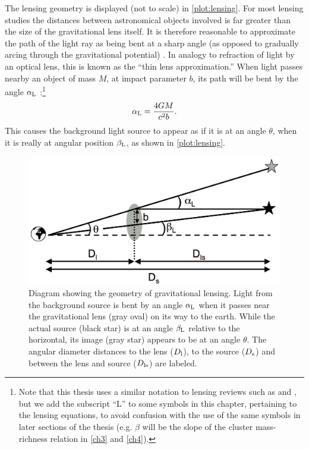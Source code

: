 The lensing geometry is displayed (not to scale) in \autoref{plot:lensing}. For most lensing studies the distances between astronomical objects involved is far greater than the size of the gravitational lens itself. It is therefore reasonable to approximate the path of the light ray as being bent at a sharp angle (as opposed to gradually arcing through the gravitational potential) \citep{BS01}. In analogy to refraction of light by an optical lens, this is known as the ``thin lens approximation.'' When light passes nearby an object of mass $M$, at impact parameter $b$, its path will be bent by the angle $\alpha_{\rm L}$ \citep{RydenText}:\footnote{Note that this thesis uses a similar notation to lensing reviews such as \citet{BS01} and \citet{Schneider06_WeakGravLens}, but we add the subscript ``L'' to some symbols in this chapter, pertaining to the lensing equations, to avoid confusion with the use of the same symbols in later sections of the thesis (e.g. $\beta$ will be the slope of the cluster mass-richness relation in \autoref{ch3} and \autoref{ch4}).}
\begin{equation}
\alpha_{\rm L} = \frac{4GM}{c^2 b}.
\end{equation}
This causes the background light source to appear as if it is at an angle $\theta$, when it is really at angular position $\beta_{\rm L}$, as shown in \autoref{plot:lensing}.

\begin{figure}
\begin{center}
\includegraphics[scale=0.4]{plots_intro/LensDiagram.png}
\caption[Gravitational Lensing Diagram]{Diagram showing the geometry of gravitational lensing. Light from the background source is bent by an angle $\alpha_{\rm L}$ when it passes near the gravitational lens (gray oval) on its way to the earth. While the actual source (black star) is at an angle $\beta_{\rm L}$ relative to the horizontal, its image (gray star) appears to be at an angle $\theta$. The angular diameter distances to the lens ($D_{\rm l}$), to the source ($D_{\rm s}$) and between the lens and source ($D_{\rm ls}$) are labeled.}
\label{plot:lensing}
\end{center}
\end{figure}

